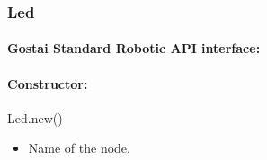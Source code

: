

\subsubsection{Led}

\paragraph{Gostai Standard Robotic API interface:} 

\paragraph{Constructor:} Led.new()

\begin{itemize}
\item {} Name of the \webots node.
\end{itemize}







